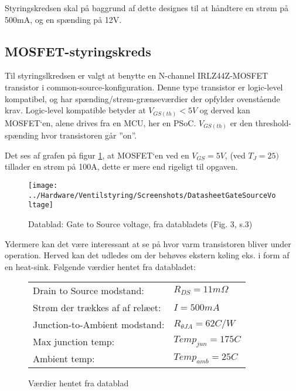 Styringskredsen skal på baggrund af dette designes til at håndtere en strøm på 500mA, og en spænding på 12V. 


\newpage
\subsection{MOSFET-styringskreds}
Til styringslkredsen er valgt at benytte en N-channel IRLZ44Z-MOSFET transistor i common-source-konfiguration. Denne type transistor er logic-level kompatibel, og har spænding/strøm-grænseværdier der opfylder ovenstående krav.  
Logic-level kompatible betyder at $ V_{GS(th)} < 5V $ og derved kan MOSFET`en, alene drives fra en MCU, her en PSoC.
$ V_{GS(th)} $ er den threshold-spænding hvor transistoren går ”on”.


Det ses af grafen på figur \ref{screenshot:GateToSourceVoltage}, at MOSFET`en ved en $ V_{GS} = 5V $, (ved $T_J = 25)$ tillader en strøm på 100A, dette er mere end rigeligt til opgaven.

\begin{figure}[!h]
	\centering
	\texttt{[image: ../Hardware/Ventilstyring/Screenshots/DatasheetGateSourceVoltage]}
	\caption{Datablad: Gate to Source voltage, fra databladets (Fig. 3, s.3)}
	\label{screenshot:GateToSourceVoltage}
\end{figure}

Ydermere kan det være interessant at se på hvor varm transistoren bliver under operation. Herved kan det udledes om der behøves ekstern køling eks. i form af en heat-sink.
Følgende værdier hentet fra databladet: 

\begin{figure}[!h]
	\begin{center}
		\begin{tabular}{ l l }
 			Drain to Source modstand:          & $R_{DS}=11 m\Omega$ \\ 
 			Strøm der trækkes af af relæet:    & $I = 500 mA$ \\  
 			Junction-to-Ambient modstand:      & $R_{\theta JA}=62 C/W$ \\   
 			Max junction temp:                 & $Temp_{jun}=175 C$ \\
 			Ambient temp:                      & $Temp_{amb}=25 C$ \\
		\end{tabular}
	\end{center}
\caption{Værdier hentet fra datablad}
\end{figure}

